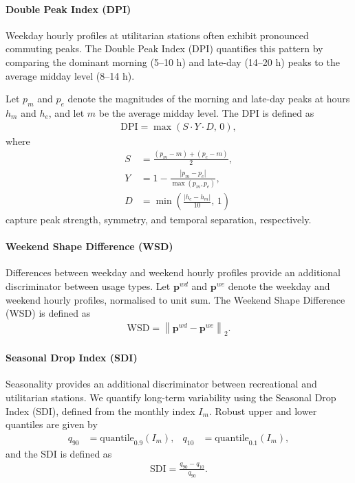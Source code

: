 \documentclass{article}
\begin{document}
\paragraph{Double Peak Index (DPI)}
Weekday hourly profiles at utilitarian stations often exhibit pronounced commuting peaks.
The Double Peak Index (DPI) quantifies this pattern by comparing the dominant morning (5–10 h) and late-day (14–20 h) peaks to the average midday level (8–14 h).

Let $p_m$ and $p_e$ denote the magnitudes of the morning and late-day peaks at hours $h_m$ and $h_e$, and let $m$ be the average midday level.
The DPI is defined as
\begin{align*}
\mathrm{DPI} = \max\!\left( S \cdot Y \cdot D,\, 0 \right),
\end{align*}
where
\begin{align*}
S &= \tfrac{(p_m - m) + (p_e - m)}{2}, \\
Y &= 1 - \tfrac{|p_m - p_e|}{\max(p_m, p_e)}, \\
D &= \min\!\left(\tfrac{|h_e - h_m|}{10},\, 1\right)
\end{align*}
capture peak strength, symmetry, and temporal separation, respectively.


\paragraph{Weekend Shape Difference (WSD)}
Differences between weekday and weekend hourly profiles provide an additional discriminator between usage types.
Let $\mathbf{p}^{wd}$ and $\mathbf{p}^{we}$ denote the weekday and weekend hourly profiles, normalised to unit sum.
The Weekend Shape Difference (WSD) is defined as
\begin{align*}
\mathrm{WSD} =
\left\lVert
\mathbf{p}^{wd}
-
\mathbf{p}^{we}
\right\rVert_2 .
\end{align*}

\paragraph{Seasonal Drop Index (SDI)}
Seasonality provides an additional discriminator between recreational and utilitarian stations.
We quantify long-term variability using the Seasonal Drop Index (SDI), defined from the monthly index $I_m$.
Robust upper and lower quantiles are given by
\begin{align*}
q_{90} &= \mathrm{quantile}_{0.9}(I_m), &
q_{10} &= \mathrm{quantile}_{0.1}(I_m),
\end{align*}
and the SDI is defined as
\begin{align*}
\mathrm{SDI} = \frac{q_{90} - q_{10}}{q_{90}} .
\end{align*}
\end{document}
